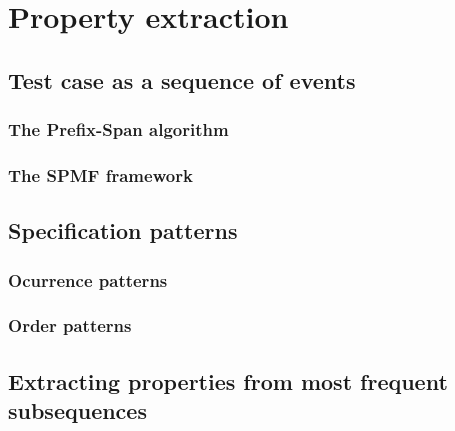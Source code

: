 \chapter{Property extraction}
\label{cap:propextract}

\section{Test case as a sequence of events}

%

\subsection{The Prefix-Span algorithm}

\subsection{The SPMF framework}

\section{Specification patterns}

\subsection{Ocurrence patterns}

\subsection{Order patterns}


\section{Extracting properties from most frequent subsequences}
